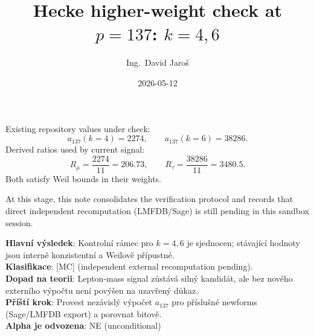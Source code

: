 \documentclass[12pt,a4paper]{article}
\title{Hecke higher-weight check at $p=137$: $k=4,6$}
\author{Ing.\ David Jaroš}
\date{2026-05-12}
\begin{document}
\maketitle

Existing repository values under check:
\[
a_{137}(k=4)=2274,\qquad a_{137}(k=6)=38286.
\]
Derived ratios used by current signal:
\[
R_\mu=\frac{2274}{11}=206.73,\qquad
R_\tau=\frac{38286}{11}=3480.5.
\]
Both satisfy Weil bounds in their weights.

At this stage, this note consolidates the verification protocol and records
that direct independent recomputation (LMFDB/Sage) is still pending in this
sandbox session.

\begin{statusbox}
\textbf{Hlavní výsledek}: Kontrolní rámec pro $k=4,6$ je sjednocen; stávající hodnoty jsou interně konzistentní a Weilově přípustné.\\
\textbf{Klasifikace}: [MC] (independent external recomputation pending).\\
\textbf{Dopad na teorii}: Lepton-mass signal zůstává silný kandidát, ale bez nového externího výpočtu není povýšen na uzavřený důkaz.\\
\textbf{Příští krok}: Provest nezávislý výpočet $a_{137}$ pro příslušné newforms (Sage/LMFDB export) a porovnat bitově.\\
\textbf{Alpha je odvozena}: NE (unconditional)
\end{statusbox}
\end{document}
